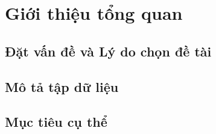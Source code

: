 \section{Giới thiệu tổng quan}
\subsection{Đặt vấn đề và Lý do chọn đề tài}

\subsection{Mô tả tập dữ liệu}

\subsection{Mục tiêu cụ thể}
